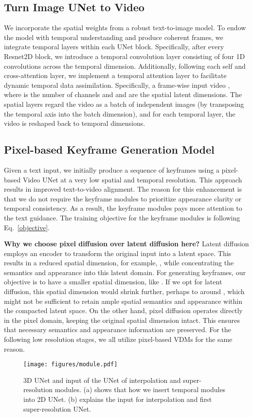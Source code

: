 \documentclass{article} \usepackage{iclr2024_conference,times}
\begin{document}
\subsection{Turn Image UNet to Video} We incorporate the spatial weights from a robust text-to-image model. To endow the model with temporal understanding and produce coherent frames, we integrate temporal layers within each UNet block. Specifically, after every Resnet2D block, we introduce a temporal convolution layer consisting of four 1D convolutions across the temporal dimension. Additionally, following each self and cross-attention layer, we implement a temporal attention layer to facilitate dynamic temporal data assimilation. 
Specifically, a frame-wise input video ,
where  is the number of  channels and  and  are the spatial latent dimensions.
The spatial layers regard the video as a batch of independent images (by transposing the temporal axis into the batch dimension), and for each temporal layer, the video is reshaped back to temporal dimensions.

\subsection{Pixel-based Keyframe Generation Model} Given a text input, we initially produce a sequence of keyframes using a pixel-based Video UNet at a very low spatial and temporal resolution. This approach results in improved text-to-video alignment. The reason for this enhancement is that we do not require the keyframe modules to prioritize appearance clarity or temporal consistency. As a result, the keyframe modules pays more attention to the text guidance. The training objective for the keyframe modules is following Eq.~\ref{objective}.  

\noindent\textbf{Why we choose pixel diffusion over latent diffusion here?}
Latent diffusion employs an encoder to transform the original input  into a latent space. This results in a reduced spatial dimension, for example, , while concentrating the semantics and appearance into this latent domain. For generating keyframes, our objective is to have a smaller spatial dimension, like . If we opt for latent diffusion, this spatial dimension would shrink further, perhaps to around , which might not be sufficient to retain ample spatial semantics and appearance within the compacted latent space. On the other hand, pixel diffusion operates directly in the pixel domain, keeping the original spatial dimension intact. This ensures that  necessary semantics and appearance information are preserved. For the following low resolution stages, we all utilize pixel-based VDMs for the same reason.
\begin{figure}[t]
    \centering
    \texttt{[image: figures/module.pdf]}
    \caption{3D UNet and input of the UNet of interpolation and super-resolution modules. (a) shows that how we insert temporal modules into 2D UNet. (b) explains the input for interpolation and first super-resolution UNet.}
    \label{fig:block}
\end{figure}
\end{document}

